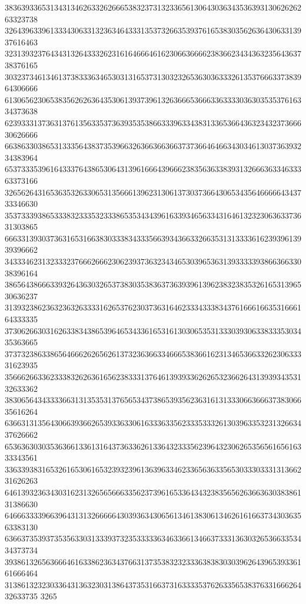 38363933653134313462633262666538323731323365613064303634353639313062626263323738
32643963396133343063313236346433313537326635393761653830356263643063313937616463
32313932376434313264333262316164666461623066366662383662343436323564363738376165
30323734613461373833363465303131653731303232653630363332613537666337383964306666
61306562306538356262636435306139373961326366653666336333303630353537616334373638
62393331373631376135633537363935353866333963343831336536643632343237366630626666
66386330386531333564383735396632636636636637373664646634303461303736393234383964
65373335396164333764386530643139616664396662383563633839313266636334633363373166
32656264316536353263306531356661396231306137303736643065343564666664343733346630
35373339386533383233353233386535343439616339346563343164613232306363373631303865
66633139303736316531663830333834333566393436633266353131333361623939613939396662
34333462313233323766626662306239373632343465303965363139333339386636633038396164
38656438666339326436303265373830353836373639396139623832383532616531396530636237
31393238623632363263333162653762303736316462333433383437616661663531666164333335
37306266303162633834386539646534336165316130306535313330393063383335303435363665
37373238633865646662626562613732363663346665383661623134653663326230633331623935
35666266336233383262636165623833313764613939336262653236626431393934353132633362
38306564343333663131353531376565343738653935623631613133306636663738306635616264
63663131356430663936626539336330616333633562333533326130396335323132663437626662
65363630303536366133613164373633626133643233356239643230626535656165616333343561
33633938316532616530616532393239613639633462336563633565303330333131366231626263
64613932363430316231326565666335623739616533643432383565626366363038386131386630
64666333396639643131326666643039363430656134613830613462616166373430363563383130
63663735393735356330313339373235333336346336613466373331363032653663353434373734
39386132656366646163386236343766313735383232333638383030396264396539336161666464
31386132323033643136323031386437353166373163333537626335653837633166626432633735
3265
